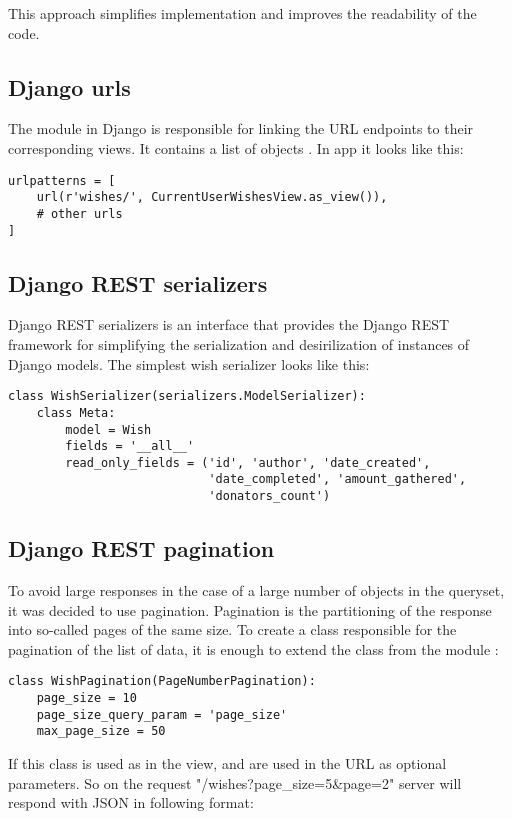 This approach simplifies implementation and improves the readability of the code.


\subsection{Django urls}
The  module in Django is responsible for linking the \ac{URL} endpoints to their corresponding views. It
contains a list of objects . In  app it looks like this:

\begin{lstlisting}
urlpatterns = [
    url(r'wishes/', CurrentUserWishesView.as_view()),
    # other urls
]
\end{lstlisting}


\subsection{Django REST serializers}
Django REST serializers is an interface that provides the Django REST framework for simplifying the serialization and
desirilization of instances of Django models. The simplest wish serializer looks like this:
\begin{lstlisting}
class WishSerializer(serializers.ModelSerializer):
    class Meta:
        model = Wish
        fields = '__all__'
        read_only_fields = ('id', 'author', 'date_created',
                            'date_completed', 'amount_gathered',
                            'donators_count')
\end{lstlisting}


\subsection{Django REST pagination}
To avoid large responses in the case of a large number of objects in the queryset, it was decided to use pagination.
Pagination is the partitioning of the response into so-called pages of the same size. To create a class responsible for
the pagination of the list of data, it is enough to extend the  class from the module
:

\begin{lstlisting}
class WishPagination(PageNumberPagination):
    page_size = 10
    page_size_query_param = 'page_size'
    max_page_size = 50
\end{lstlisting}

If this class is used as  in the view,  and  are used in the
\ac{URL} as optional parameters. So on the request "/wishes?page\_size=5\&page=2" server will respond with \ac{JSON} in
following format:

